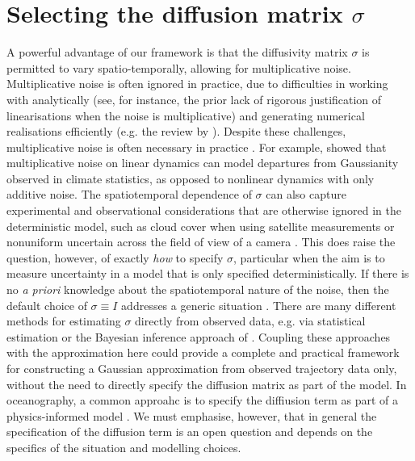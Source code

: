 \section{Selecting the diffusion matrix \(\sigma\)}
A powerful advantage of our framework is that the diffusivity matrix \(\sigma\) is permitted to vary spatio-temporally, allowing for multiplicative noise.
Multiplicative noise is often ignored in practice, due to difficulties in working with analytically (see, for instance, the prior lack of rigorous justification of linearisations when the noise is multiplicative) and generating numerical realisations efficiently (e.g. the review by \cite{MoraEtAl_2017_StableNumericalScheme}).
Despite these challenges, multiplicative noise is often necessary in practice \citep{Sura_2003_StochasticAnalysisSouthern,KamenkovichEtAl_2015_PropertiesOriginsAnisotropic,anymore?}.
For example, \citet{SuraEtAl_2005_MultiplicativeNoiseNonGaussianity} showed that multiplicative noise on linear dynamics can model departures from Gaussianity observed in climate statistics, as opposed to nonlinear dynamics with only additive noise.
The spatiotemporal dependence of \(\sigma\) can also capture experimental and observational considerations that are otherwise ignored in the deterministic model, such as cloud cover when using satellite measurements or nonuniform uncertain across the field of view of a camera \citehere.
This does raise the question, however, of exactly \emph{how} to specify \(\sigma\), particular when the aim is to measure uncertainty in a model that is only specified deterministically.
If there is no \emph{a priori} knowledge about the spatiotemporal nature of the noise, then the default choice of \(\sigma \equiv I\) addresses a generic situation \citehere.
There are many different methods for estimating \(\sigma\) directly from observed data, e.g. via statistical estimation \citep{CotterPavliotis_2009_EstimatingEddyDiffusivities}  or the Bayesian inference approach of \citet{YingEtAl_2019_BayesianInferenceOcean}.
Coupling these approaches with the approximation here could provide a complete and practical framework for constructing a Gaussian approximation from observed trajectory data only, without the need to directly specify the diffusion matrix as part of the model.
In oceanography, a common approahc is to specify the diffiusion term as part of a physics-informed model \citep{BerloffMcWilliams_2002_MaterialTransportOceanic}.
We must emphasise, however, that in general the specification of the diffusion term is an open question and depends on the specifics of the situation and modelling choices.

